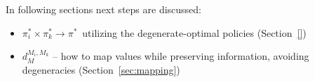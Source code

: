 In following sections next steps are discussed:
\begin{itemize}
\item $\pi^\ast_i \times \pi^\ast_k \to \pi^\ast${\ }utilizing the degenerate-optimal policies (Section~\ref{})
\item $d^{M_i, M_k}_{M}$ -- how to map values while preserving information, avoiding degeneracies (Section~\ref{sec:mapping})
\end{itemize}

